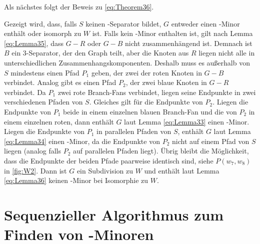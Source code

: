 Als nächstes folgt der Beweis zu \ref{eq:Theorem36}.
\begin{beweis}
  Gezeigt wird, dass, falls $S$ keinen \dd-Separator bildet, $G$ entweder einen \kf-Minor enthält oder isomorph zu $W$ ist.
  Falls kein \kf-Minor enthalten ist, gilt nach Lemma \ref{eq:Lemma35}, dass $G - R$ oder $G - B$ nicht zusammenhängend ist.
  Demnach ist $B$ ein $3$-Separator, der den Graph teilt, aber die Knoten aus $R$ liegen nicht alle in unterschiedlichen Zusammenhangskomponenten.
  Deshalb muss es außerhalb von $S$ mindestens einen Pfad $P_1$ geben, der zwei der roten Knoten in $G - B$ verbindet.
  Analog gibt es einen Pfad $P_2$, der zwei blaue Knoten in $G - R$ verbindet.
  Da $P_1$ zwei rote Branch-Fans verbindet, liegen seine Endpunkte in zwei verschiedenen Pfaden von $S$.
  Gleiches gilt für die Endpunkte von $P_2$.
  Liegen die Endpunkte von $P_1$ beide in einem einzelnen blauen Branch-Fan und die von $P_2$ in einem einzelnen roten, dann enthält $G$ laut Lemma \ref{eq:Lemma33} einen \kf-Minor.
  Liegen die Endpunkte von $P_1$ in parallelen Pfaden von $S$, enthält $G$ laut Lemma \ref{eq:Lemma34} einen \kf-Minor, da die Endpunkte von $P_2$ nicht auf einem Pfad von $S$ liegen (analog falls $P_2$ auf parallelen Pfaden liegt).
  Übrig bleibt die Möglichkeit, dass die Endpunkte der beiden Pfade paarweise identisch sind, siehe $P(w_7, w_8)$ in \Abb \ref{fig:W2}.
  Dann ist $G$ ein Subdivision zu $W$ und enthält laut Lemma \ref{eq:Lemma36} keinen \kf-Minor bei Isomorphie zu $W$.
\end{beweis}


\section{Sequenzieller Algorithmus zum Finden von \kf-Minoren}
\label{sec:sequenzieller_algorithmus_zum_finden_von_kf_minoren}

